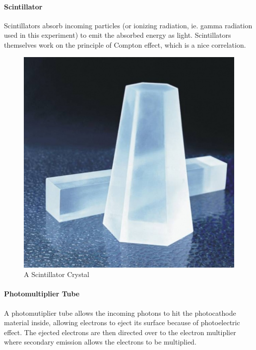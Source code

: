 			\paragraph{Scintillator}
				Scintillators absorb incoming particles (or ionizing radiation, ie. gamma radiation used in this experiment) to emit the absorbed energy as light. Scintillators themselves work on the principle of Compton effect, which is a nice correlation.
				\begin{figure}[h]
					\caption{A Scintillator Crystal}
					\centering
					\includegraphics[width=\textwidth / 2]{images/scintillator.jpg}
				\end{figure}
			
			\paragraph{Photomultiplier Tube}
				A photomutiplier tube allows the incoming photons to hit the photocathode material inside, allowing electrons to eject its surface because of photoelectric effect. The ejected electrons are then directed over to the electron multiplier where secondary emission allows the electrons to be multiplied.
			
